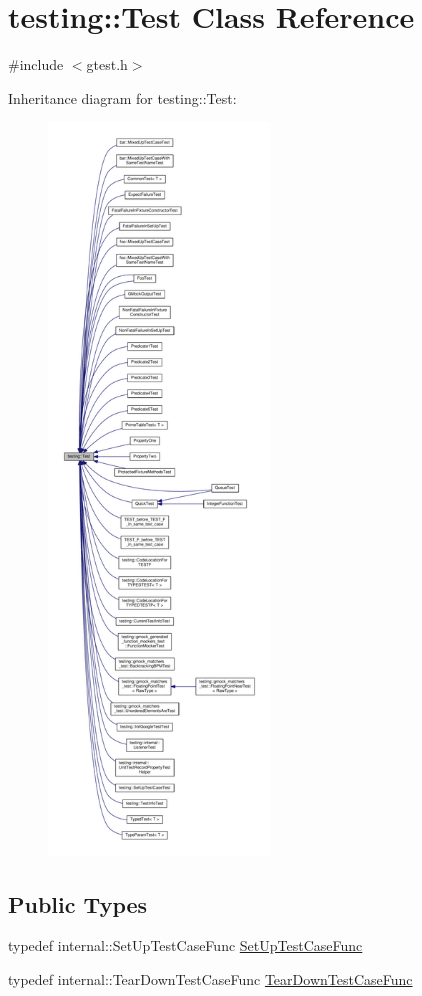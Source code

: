 \hypertarget{classtesting_1_1Test}{}\section{testing\+:\+:Test Class Reference}
\label{classtesting_1_1Test}


{\ttfamily \#include $<$gtest.\+h$>$}



Inheritance diagram for testing\+:\+:Test\+:\nopagebreak
\begin{figure}[H]
\begin{center}
\leavevmode
\includegraphics[height=550pt]{classtesting_1_1Test__inherit__graph}
\end{center}
\end{figure}
\subsection*{Public Types}
\begin{DoxyCompactItemize}
\item 
typedef internal\+::\+Set\+Up\+Test\+Case\+Func \hyperlink{classtesting_1_1Test_a5f2a051d1d99c9b784c666c586186cf9}{Set\+Up\+Test\+Case\+Func}
\item 
typedef internal\+::\+Tear\+Down\+Test\+Case\+Func \hyperlink{classtesting_1_1Test_aa0f532e93b9f3500144c53f31466976c}{Tear\+Down\+Test\+Case\+Func}
\end{DoxyCompactItemize}

